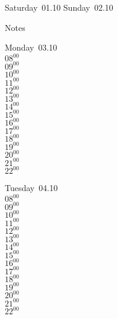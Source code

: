 \documentclass[11pt,a4paper]{book}\usepackage[]{graphicx}\usepackage[]{color}
\begin{document}
\begin{weekendbox}
  Saturday~01.10
  \tcblower
  Sunday~02.10
\end{weekendbox} %
\begin{notebox}
  Notes
\end{notebox}
\clearpage
\begin{headerbox}
\end{headerbox}
\begin{weekdaybox}
  Monday~03.10\\
  { 
  \vfill
  $08^{00}$\\
$09^{00}$\\
$10^{00}$\\
$11^{00}$\\
$12^{00}$\\
$13^{00}$\\
$14^{00}$\\
$15^{00}$\\
$16^{00}$\\
$17^{00}$\\
$18^{00}$\\
$19^{00}$\\
$20^{00}$\\
$21^{00}$\\
$22^{00}$\\
  }
\end{weekdaybox}
\begin{weekdaybox}
  Tuesday~04.10\\
  { 
  \vfill
  $08^{00}$\\
$09^{00}$\\
$10^{00}$\\
$11^{00}$\\
$12^{00}$\\
$13^{00}$\\
$14^{00}$\\
$15^{00}$\\
$16^{00}$\\
$17^{00}$\\
$18^{00}$\\
$19^{00}$\\
$20^{00}$\\
$21^{00}$\\
$22^{00}$\\
  }
\end{weekdaybox}
\end{document}
